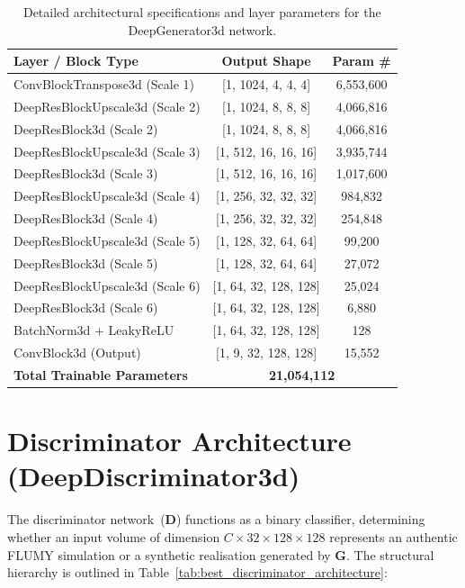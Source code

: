\begin{table}[htbp]
    \centering
    \renewcommand{\arraystretch}{1.2}
    \begin{tabular}{p{}cc}
        \hline
        \textbf{Layer / Block Type} & \textbf{Output Shape} & \textbf{Param \#} \\
        \hline
        ConvBlockTranspose3d (Scale 1) & [1, 1024, 4, 4, 4] & 6,553,600 \\
        DeepResBlockUpscale3d (Scale 2) & [1, 1024, 8, 8, 8] & 4,066,816 \\
        DeepResBlock3d (Scale 2) & [1, 1024, 8, 8, 8] & 4,066,816 \\
        DeepResBlockUpscale3d (Scale 3) & [1, 512, 16, 16, 16] & 3,935,744 \\
        DeepResBlock3d (Scale 3) & [1, 512, 16, 16, 16] & 1,017,600 \\
        DeepResBlockUpscale3d (Scale 4) & [1, 256, 32, 32, 32] & 984,832 \\
        DeepResBlock3d (Scale 4) & [1, 256, 32, 32, 32] & 254,848 \\
        DeepResBlockUpscale3d (Scale 5) & [1, 128, 32, 64, 64] & 99,200 \\
        DeepResBlock3d (Scale 5) & [1, 128, 32, 64, 64] & 27,072 \\
        DeepResBlockUpscale3d (Scale 6) & [1, 64, 32, 128, 128] & 25,024 \\
        DeepResBlock3d (Scale 6) & [1, 64, 32, 128, 128] & 6,880 \\
        BatchNorm3d + LeakyReLU & [1, 64, 32, 128, 128] & 128 \\
        ConvBlock3d (Output) & [1, 9, 32, 128, 128] & 15,552 \\
        \hline
        \textbf{Total Trainable Parameters} & \multicolumn{2}{c}{\textbf{21,054,112}} \\
        \hline
    \end{tabular}
    \caption{Detailed architectural specifications and layer parameters for the DeepGenerator3d network.}
    \label{tab:best_generator_architecture}
\end{table}

\section{Discriminator Architecture (DeepDiscriminator3d)}\label{sec:app_discriminator_arch}
The discriminator network~($\mathbf{D}$) functions as a binary classifier, determining whether an input volume of dimension $C \times 32 \times 128 \times 128$ represents an authentic FLUMY simulation or a synthetic realisation generated by $\mathbf{G}$. The structural hierarchy is outlined in Table~\ref{tab:best_discriminator_architecture}:

